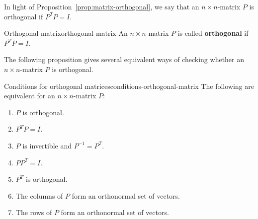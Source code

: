 \documentclass{ximera}
\begin{document}
In light of Proposition~\ref{prop:matrix-orthogonal}, we say that an
$n\times n$-matrix $P$ is orthogonal if $P^TP=I$.

\begin{definition}{Orthogonal matrix}{orthogonal-matrix}
  An $n\times n$-matrix $P$ is called \textbf{orthogonal}%
   if $P^TP=I$.
\end{definition}

The following proposition gives several equivalent ways of checking
whether an $n\times n$-matrix $P$ is orthogonal.

\begin{proposition}{Conditions for orthogonal matrices}{conditions-orthogonal-matrix}
  The following are equivalent for an $n\times n$-matrix $P$:

    \begin{enumerate}
    \item $P$ is orthogonal.
    \item $P^TP=I$.
    \item $P$ is invertible and $P^{-1}=P^T$.
    \item $PP^T=I$.
    \item $P^T$ is orthogonal.
    \item The columns of $P$ form an orthonormal set of vectors.
    \item The rows of $P$ form an orthonormal set of vectors.
    \end{enumerate}

\end{proposition}
\end{document}
